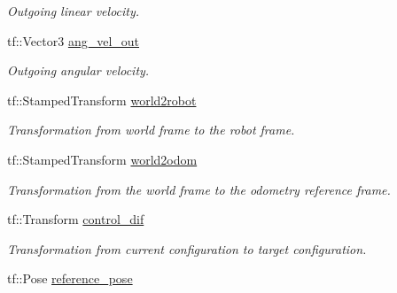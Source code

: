 \begin{DoxyCompactItemize}
\begin{DoxyCompactList}\small\item\em Outgoing linear velocity. \end{DoxyCompactList}\item 
tf\+::\+Vector3 \hyperlink{classController_a8c96a76667a4298cd15f6b49a9e23ceb}{ang\+\_\+vel\+\_\+out}\hypertarget{classController_a8c96a76667a4298cd15f6b49a9e23ceb}{}\label{classController_a8c96a76667a4298cd15f6b49a9e23ceb}

\begin{DoxyCompactList}\small\item\em Outgoing angular velocity. \end{DoxyCompactList}\item 
tf\+::\+Stamped\+Transform \hyperlink{classController_aaad279e91ae825ab17121759ec46f539}{world2robot}\hypertarget{classController_aaad279e91ae825ab17121759ec46f539}{}\label{classController_aaad279e91ae825ab17121759ec46f539}

\begin{DoxyCompactList}\small\item\em Transformation from world frame to the robot frame. \end{DoxyCompactList}\item 
tf\+::\+Stamped\+Transform \hyperlink{classController_a0fbeee8dd4ee75f98ca860f1878ba4dd}{world2odom}\hypertarget{classController_a0fbeee8dd4ee75f98ca860f1878ba4dd}{}\label{classController_a0fbeee8dd4ee75f98ca860f1878ba4dd}

\begin{DoxyCompactList}\small\item\em Transformation from the world frame to the odometry reference frame. \end{DoxyCompactList}\item 
tf\+::\+Transform \hyperlink{classController_a171362bdb7fa9335627a5c16e3716525}{control\+\_\+dif}\hypertarget{classController_a171362bdb7fa9335627a5c16e3716525}{}\label{classController_a171362bdb7fa9335627a5c16e3716525}

\begin{DoxyCompactList}\small\item\em Transformation from current configuration to target configuration. \end{DoxyCompactList}\item 
tf\+::\+Pose \hyperlink{classController_a804862aff250a2857c2e145615ae0fdb}{reference\+\_\+pose}\hypertarget{classController_a804862aff250a2857c2e145615ae0fdb}{}\label{classController_a804862aff250a2857c2e145615ae0fdb}


\end{DoxyCompactItemize}
